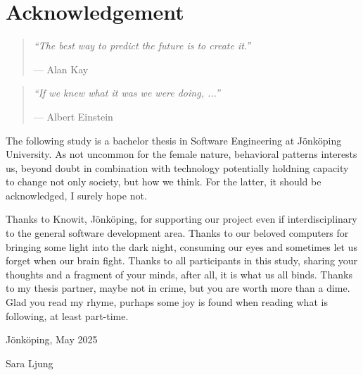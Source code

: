 
\newpage
\chapter*{Acknowledgement}
{}

\begin{center} 
    \begin{minipage}{0.7\textwidth}
        \begin{quote}\itshape
            “The best way to predict the future is to create it.”\par
            \hfill— Alan Kay
          \end{quote}
      
          \begin{quote}\itshape
            “If we knew what it was we were doing, ...”\par
            \hfill— Albert Einstein
          \end{quote}
    \end{minipage}
\end{center}
\vspace{0.6cm}

The following study is a bachelor thesis in Software Engineering at Jönköping University. As not uncommon for the female nature, behavioral 
patterns interests us, beyond doubt in combination with technology potentially holdning capacity to change not only society, but how we think. 
For the latter, it should be acknowledged, I surely hope not. 

\medskip
Thanks to Knowit, Jönköping, for supporting our project even if interdisciplinary to the general software development area. 
Thanks to our beloved computers for bringing some light into the dark night, consuming our eyes and sometimes let us forget when our brain fight. 
Thanks to all participants in this study, sharing your thoughts and a fragment of your minds, after all, it is what us all binds. 
Thanks to my thesis partner, maybe not in crime, but you are worth more than a dime. 
Glad you read my rhyme, purhaps some joy is found when reading what is following, at least part-time. 

\medskip
Jönköping, May 2025

\medskip
Sara Ljung

\vspace{0.3cm}


